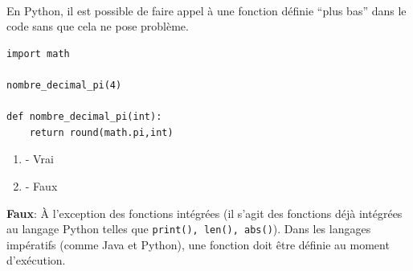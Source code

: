 \begin{Exercice}[2 minutes]\\
En Python, il est possible de faire appel à une fonction définie ``plus bas'' dans le code sans que cela ne pose problème.

\begin{lstlisting}
import math

nombre_decimal_pi(4)

def nombre_decimal_pi(int):
    return round(math.pi,int)
\end{lstlisting}

\begin{enumerate}
    \item - Vrai
    \item - Faux
\end{enumerate}
\begin{solution}
    \textbf{Faux}: À l'exception des fonctions intégrées (il s'agit des fonctions déjà intégrées au langage Python telles que \lstinline{print(), len(), abs()}). Dans les langages impératifs (comme Java et Python), une fonction doit être définie au moment d'exécution.
\end{solution}
\end{Exercice}



